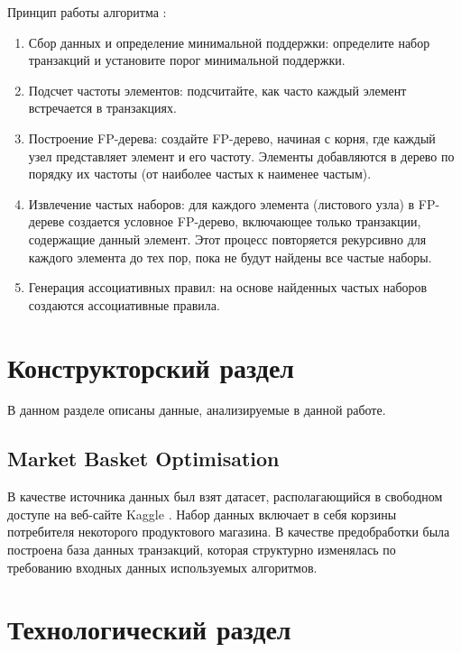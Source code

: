 \documentclass[12pt]{report}
\begin{document}
Принцип работы алгоритма \cite{fpgrowth}:
\begin{enumerate}
    \item Сбор данных и определение минимальной поддержки: определите набор транзакций и установите порог минимальной поддержки.

    \item Подсчет частоты элементов: подсчитайте, как часто каждый элемент встречается в транзакциях.

    \item Построение FP-дерева: создайте FP-дерево, начиная с корня, где каждый узел представляет элемент и его частоту. Элементы добавляются в дерево по порядку их частоты (от наиболее частых к наименее частым).

    \item Извлечение частых наборов: для каждого элемента (листового узла) в FP-дереве создается условное FP-дерево, включающее только транзакции, содержащие данный элемент. Этот процесс повторяется рекурсивно для каждого элемента до тех пор, пока не будут найдены все частые наборы.

    \item Генерация ассоциативных правил: на основе найденных частых наборов создаются ассоциативные правила.
\end{enumerate}
\pagebreak

\chapter{Конструкторский раздел}

В данном разделе описаны данные, анализируемые в данной работе.

\section{Market Basket Optimisation}

В качестве источника данных был взят датасет, располагающийся в свободном доступе на веб-сайте Kaggle \cite{dataset}. Набор данных включает в себя корзины потребителя некоторого продуктового магазина. В качестве предобработки была построена база данных транзакций, которая структурно изменялась по требованию входных данных используемых алгоритмов.

\pagebreak

\chapter{Технологический раздел}
\end{document}
